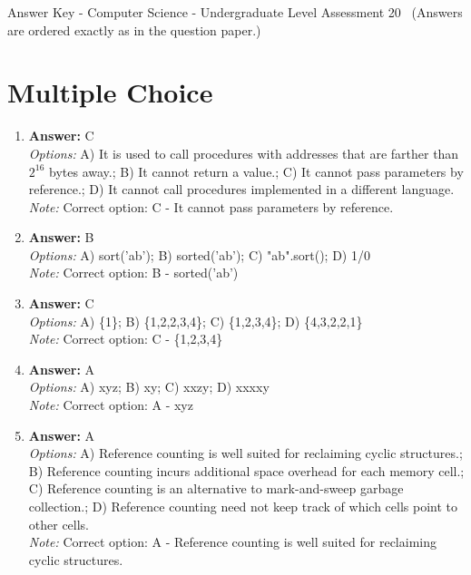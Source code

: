 \documentclass[12pt]{article}
\begin{document}
\begin{center}
Answer Key - Computer Science - Undergraduate Level Assessment 20 \
\small (Answers are ordered exactly as in the question paper.)
\end{center}

\section*{Multiple Choice}
\begin{enumerate}[label=\arabic*.]
\item \textbf{Answer:} C
\\ \textit{Options:} A) It is used to call procedures with addresses that are farther than $2^16$ bytes away.; B) It cannot return a value.; C) It cannot pass parameters by reference.; D) It cannot call procedures implemented in a different language.
\\ \textit{Note:} Correct option: C - It cannot pass parameters by reference.
\item \textbf{Answer:} B
\\ \textit{Options:} A) sort('ab'); B) sorted('ab'); C) "ab".sort(); D) 1/0
\\ \textit{Note:} Correct option: B - sorted('ab')
\item \textbf{Answer:} C
\\ \textit{Options:} A) \{1\}; B) \{1,2,2,3,4\}; C) \{1,2,3,4\}; D) \{4,3,2,2,1\}
\\ \textit{Note:} Correct option: C - \{1,2,3,4\}
\item \textbf{Answer:} A
\\ \textit{Options:} A) xyz; B) xy; C) xxzy; D) xxxxy
\\ \textit{Note:} Correct option: A - xyz
\item \textbf{Answer:} A
\\ \textit{Options:} A) Reference counting is well suited for reclaiming cyclic structures.; B) Reference counting incurs additional space overhead for each memory cell.; C) Reference counting is an alternative to mark-and-sweep garbage collection.; D) Reference counting need not keep track of which cells point to other cells.
\\ \textit{Note:} Correct option: A - Reference counting is well suited for reclaiming cyclic structures.
\end{enumerate}
\end{document}
